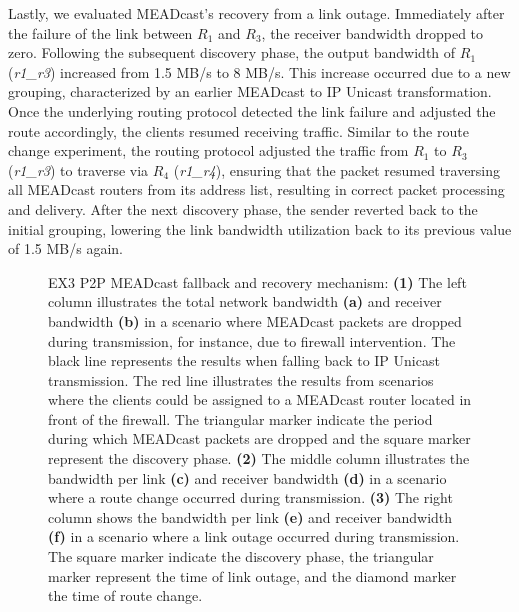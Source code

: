 Lastly, we evaluated MEADcast's recovery from a link outage.
Immediately after the failure of the link between $R_1$ and $R_3$, the receiver
    bandwidth dropped to zero.
Following the subsequent discovery phase, the output bandwidth of $R_1$
    (\textit{r1\_r3}) increased from 1.5 MB/s to 8 MB/s.
This increase occurred due to a new grouping, characterized by an earlier
    MEADcast to IP Unicast transformation.
Once the underlying routing protocol detected the link failure and adjusted
    the route accordingly, the clients resumed receiving traffic.
Similar to the route change experiment, the routing protocol adjusted the
    traffic from $R_1$ to $R_3$ (\textit{r1\_r3}) to traverse via $R_4$
    (\textit{r1\_r4}), ensuring that the packet resumed traversing all
    MEADcast routers from its address list, resulting in correct packet
    processing and delivery.
After the next discovery phase, the sender reverted back to the initial
    grouping, lowering the link bandwidth utilization back to its previous
    value of 1.5 MB/s again.

\begin{figure}
    \begin{center}
        
    \end{center}
    \caption[MEADcast fallback and recovery mechanism]{
        EX3 P2P MEADcast fallback and recovery mechanism:
        \textbf{(1)} The left column illustrates the total network bandwidth
            \textbf{(a)} and receiver bandwidth \textbf{(b)} in a scenario
            where MEADcast packets are dropped during transmission, for
            instance, due to firewall intervention.
        The black line represents the results when falling back to IP Unicast
            transmission.
        The red line illustrates the results from scenarios where the clients
            could be assigned to a MEADcast router located in front of the
            firewall.
        The triangular marker indicate the period during which MEADcast packets
            are dropped and the square marker represent the discovery phase.
        \textbf{(2)} The middle column illustrates the bandwidth per link
            \textbf{(c)} and receiver bandwidth \textbf{(d)} in a scenario
            where a route change occurred during transmission.
        \textbf{(3)} The right column  shows the bandwidth per link
            \textbf{(e)} and receiver bandwidth \textbf{(f)} in a scenario
            where a link outage occurred during transmission.
        The square marker indicate the discovery phase, the triangular marker
            represent the time of link outage, and the diamond marker the time 
            of route change.
        }
    \label{fig:dyn_net_env}
\end{figure}

